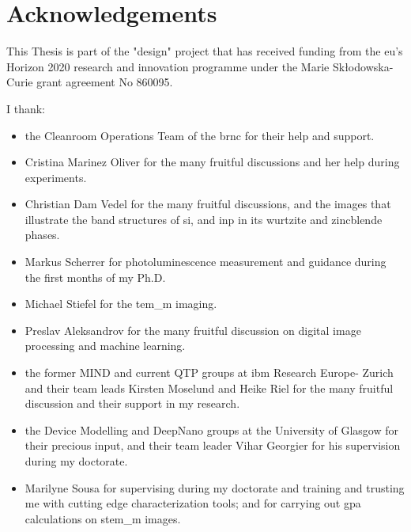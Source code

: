 \chapter{Acknowledgements}

This Thesis is part of the "\acl{design}" project that has received funding from the \acl{eu}’s Horizon 2020 research and innovation programme under the Marie Skłodowska-Curie grant agreement No 860095. 

I thank:
\begin{itemize}
    \item the Cleanroom Operations Team of the \acl{brnc} for their help and support. 
    \item Cristina Marinez Oliver for the many fruitful discussions and her help during experiments.
    \item Christian Dam Vedel for the many fruitful discussions, and the images that illustrate the band structures of \acs{si}, and \acs{inp} in its wurtzite and zincblende phases.
    \item Markus Scherrer for photoluminescence measurement and guidance during the first months of my Ph.D. 
    \item Michael Stiefel for the \acs{tem_m} imaging. 
    \item Preslav Aleksandrov for the many fruitful discussion on digital image processing and machine learning.
    \item the former MIND and current QTP groups at \acs{ibm} Research Europe- Zurich and their team leads Kirsten Moselund and Heike Riel for the many fruitful discussion and their support in my research.
    \item the Device Modelling and DeepNano groups at the University of Glasgow for their precious input, and their team leader Vihar Georgier for his supervision during my doctorate.
    \item Marilyne Sousa for supervising during my doctorate and training and trusting me with cutting edge characterization tools; and for carrying out \acs{gpa} calculations on \acs{stem_m} images. 
\end{itemize}



